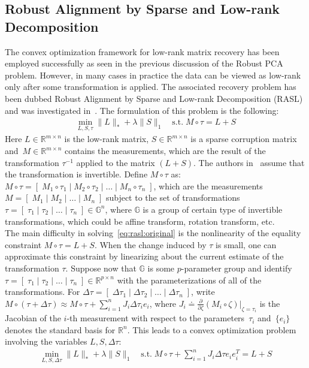 \subsection{Robust Alignment by Sparse and Low-rank Decomposition}
\label{subsec: RASL}

The convex optimization framework for low-rank matrix recovery has been employed successfully as seen in the previous discussion of the Robust PCA problem. However, in many cases in practice the data can be viewed as low-rank only after some transformation is applied. The associated recovery problem has been dubbed Robust Alignment by Sparse and Low-rank Decomposition (RASL) and was investigated in~\cite{Peng:2010}. The formulation of this problem is the following:
%
\begin{align}
\min_{L, S, \tau}  \|L\|_{*} + \lambda\|S\|_{1} \quad  \text{s.t.} \;  M\circ\tau = L+S
\label{eq:rasl:original}
\end{align}
%
Here $L \in\mathbb{R}^{m\times n}$ is the low-rank matrix, $S\in\mathbb{R}^{m\times n}$ is a sparse corruption matrix and~$M\in\mathbb{R}^{m\times n}$ contains the measurements, which are the result of the transformation $\tau^{-1}$ applied to the matrix $(L+S)$. The authors in~\cite{Peng:2010} assume that the transformation is invertible. Define $M\circ\tau$ as: $M\circ\tau = [\;M_{1}\circ\tau_{1} \;|\;M_{2}\circ\tau_{2} \;|\; \dots \;|\; M_{n}\circ\tau_{n}\;]$, which are the measurements $M=[\;M_{1} \;|\;M_{2} \;|\; \dots \;|\; M_{n}\;]$ subject to the set of transformations $\tau=[\;\tau_{1} \;|\;\tau_{2} \;|\; \dots \;|\; \tau_{n}\;] \in\mathbb{G}^n$, where $\mathbb{G}$ is a group of certain type of invertible transformations, which could be affine transform, rotation transform, etc.  \\

The main difficulty in solving~\eqref{eq:rasl:original} is the nonlinearity of the equality constraint $M\circ\tau = L+S$. When the change induced by $\tau$ is small, one can approximate this constraint by linearizing about the current estimate of the transformation $\tau$. Suppose now that $\mathbb{G}$ is some $p$-parameter group and identify $\tau=[\;\tau_{1} \;|\;\tau_{2} \;|\; \dots \;|\; \tau_{n}\;] \in \mathbb{R}^{p\times n}$ with the parameterizations of all of the transformations. For $\Delta\tau = [\;\Delta\tau_{1} \;|\; \Delta\tau_{2} \;|\; \dots \;|\; \Delta\tau_{n}\;]$, write $M\circ(\tau+\Delta\tau) \approx M\circ\tau + \sum_{i=1}^n J_{i}\Delta\tau_{i}e_{i}$, where $J_{i} \doteq \frac{\partial}{\partial\zeta}(M_{i}\circ\zeta)|_{\zeta = \tau_{i}}$ is the Jacobian of the $i$-th measurement with respect to the parameters~$\tau_{i}$ and~$\{e_{i}\}$ denotes the standard basis for $\mathbb{R}^n$. This leads to a convex optimization problem involving the variables $L, S, \Delta\tau$:
%
\begin{align}
\min_{L, S, \Delta\tau}  \|L\|_{*} + \lambda\|S\|_{1}  \quad \text{s.t.} \;  M\circ\tau + \sum_{i=1}^n J_{i}\Delta\tau e_{i}e_{i}^{T}= L+S
\label{eq:rasl:linearized}
\end{align}


